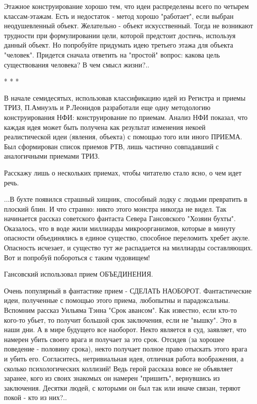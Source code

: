 \documentclass[11pt,a4paper]{article}
\begin{document}
Этажное конструирование хорошо тем, что идеи распределены всего по четырем классам-этажам. Есть и недостаток - метод хорошо "работает", если выбран неодушевленный объект. Желательно - объект искусственный. Тогда не возникают трудности при формулировании цели, которой предстоит достичь, используя данный объект. Но попробуйте придумать идею третьего этажа для объекта "человек". Придется сначала ответить на "простой" вопрос: какова цель существования человека? В чем смысл жизни?..

* * *

В начале семидесятых, использовав классификацию идей из Регистра и приемы ТРИЗ, П.Амнуэль и Р.Леонидов разработали еще одну методологию конструирования НФИ: конструирование по приемам. Анализ НФИ показал, что каждая идея может быть получена как результат изменения некоей реалистической идеи (явления, объекта) с помощью того или иного ПРИЕМА. Был сформирован список приемов РТВ, лишь частично совпадавший с аналогичными приемами ТРИЗ.

Расскажу лишь о нескольких приемах, чтобы читателю стало ясно, о чем идет речь.

...В бухте появился страшный хищник, способный лодку с людьми превратить в плоский блин. И что странно: никто этого монстра никогда не видел. Так начинается рассказ советского фантаста Севера Гансовского "Хозяин бухты". Оказалось, что в воде жили миллиарды микроорганизмов, которые в минуту опасности объединялись в единое существо, способное переломить хребет акуле. Опасность исчезает, и существо тут же распадается на миллиарды составляющих. Вот и попробуй побороться с таким чудовищем!

Гансовский использовал прием ОБЪЕДИНЕНИЯ.

Очень популярный в фантастике прием - СДЕЛАТЬ НАОБОРОТ. Фантастические идеи, полученные с помощью этого приема, любопытны и парадоксальны. Вспомним рассказ Уильяма Тэнна "Срок авансом". Как известно, если кто-то кого-то убьет, то получит большой срок заключения, если не "вышку". Это в наши дни. А в мире будущего все наоборот. Некто является в суд, заявляет, что намерен убить своего врага и получает за это срок. Отсидев (за хорошее поведение - половину срока), некто получает полное право отыскать этого врага и убить его. Согласитесь, нетривиальная идея, отличная работа воображения, а сколько психологических коллизий! Ведь герой рассказа вовсе не объявляет заранее, кого из своих знакомых он намерен "пришить", вернувшись из заключения. Десятки людей, с которыми он был так или иначе связан, теряют покой - кто из них?..
\end{document}
